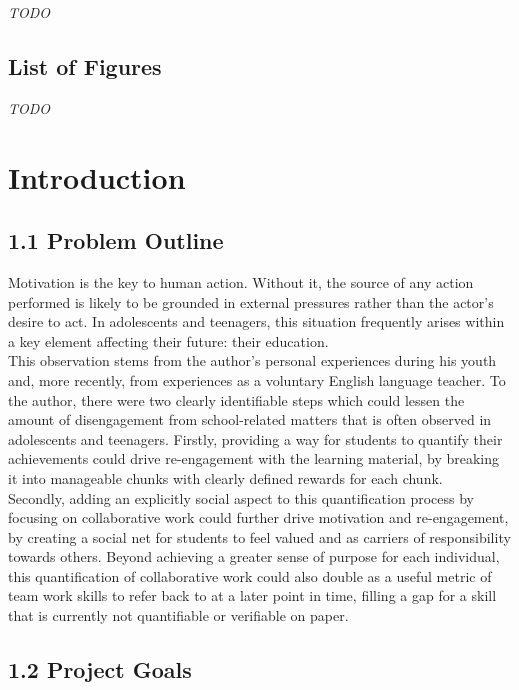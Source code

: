 \documentclass[12pt]{report}
\begin{document}
\emph{TODO}

\section{List of Figures}\label{list-of-figures}

\emph{TODO}


{
\setcounter{tocdepth}{3}
\tableofcontents
}

\chapter{Introduction}

\section{1.1 Problem Outline}\label{problem-outline}

Motivation is the key to human action. Without it, the source of any
action performed is likely to be grounded in external pressures rather
than the actor's desire to act. In adolescents and teenagers, this
situation frequently arises within a key element affecting their future:
their education.\\
This observation stems from the author's personal experiences during his
youth and, more recently, from experiences as a voluntary English
language teacher. To the author, there were two clearly identifiable
steps which could lessen the amount of disengagement from school-related
matters that is often observed in adolescents and teenagers. Firstly,
providing a way for students to quantify their achievements could drive
re-engagement with the learning material, by breaking it into manageable
chunks with clearly defined rewards for each chunk.\\
Secondly, adding an explicitly social aspect to this quantification
process by focusing on collaborative work could further drive motivation
and re-engagement, by creating a social net for students to feel valued
and as carriers of responsibility towards others. Beyond achieving a
greater sense of purpose for each individual, this quantification of
collaborative work could also double as a useful metric of team work
skills to refer back to at a later point in time, filling a gap for a
skill that is currently not quantifiable or verifiable on paper.

\section{1.2 Project Goals}\label{project-goals}
\end{document}
